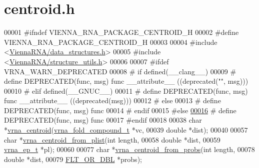 \hypertarget{centroid_8h_source}{}\section{centroid.\+h}
\label{centroid_8h_source}

\begin{DoxyCode}
00001 \textcolor{preprocessor}{#ifndef VIENNA\_RNA\_PACKAGE\_CENTROID\_H}
00002 \textcolor{preprocessor}{#define VIENNA\_RNA\_PACKAGE\_CENTROID\_H}
00003 
00004 \textcolor{preprocessor}{#include <\mbox{\hyperlink{data__structures_8h}{ViennaRNA/data\_structures.h}}>}
00005 \textcolor{preprocessor}{#include <\mbox{\hyperlink{structure__utils_8h}{ViennaRNA/structure\_utils.h}}>}
00006 
00007 \textcolor{preprocessor}{#ifdef VRNA\_WARN\_DEPRECATED}
00008 \textcolor{preprocessor}{# if defined(\_\_clang\_\_)}
00009 \textcolor{preprocessor}{#  define DEPRECATED(func, msg) func \_\_attribute\_\_ ((deprecated("", msg)))}
00010 \textcolor{preprocessor}{# elif defined(\_\_GNUC\_\_)}
00011 \textcolor{preprocessor}{#  define DEPRECATED(func, msg) func \_\_attribute\_\_ ((deprecated(msg)))}
00012 \textcolor{preprocessor}{# else}
00013 \textcolor{preprocessor}{#  define DEPRECATED(func, msg) func}
00014 \textcolor{preprocessor}{# endif}
00015 \textcolor{preprocessor}{#else}
\mbox{\hyperlink{centroid_8h_aab347a3c03fbe8e7319551b9fa0cce4a}{00016}} \textcolor{preprocessor}{# define DEPRECATED(func, msg) func}
00017 \textcolor{preprocessor}{#endif}
00018 
00038 \textcolor{keywordtype}{char} *\mbox{\hyperlink{group__centroid__fold_ga0e64bb67e51963dc71cbd4d30b80a018}{vrna\_centroid}}(\mbox{\hyperlink{group__fold__compound_structvrna__fc__s}{vrna\_fold\_compound\_t}} *vc,
00039                     \textcolor{keywordtype}{double} *dist);
00040 
00057 \textcolor{keywordtype}{char}  *\mbox{\hyperlink{group__centroid__fold_ga13881673a0b214d42a59140ef5764dbb}{vrna\_centroid\_from\_plist}}(\textcolor{keywordtype}{int} length,
00058                                 \textcolor{keywordtype}{double} *dist,
00059                                 \mbox{\hyperlink{group__struct__utils_structvrna__elem__prob__s}{vrna\_ep\_t}} *pl);
00060 
00077 \textcolor{keywordtype}{char}  *\mbox{\hyperlink{group__centroid__fold_ga98193ede06778a9ea966cc8fc43d0804}{vrna\_centroid\_from\_probs}}(\textcolor{keywordtype}{int} length,
00078                                 \textcolor{keywordtype}{double} *dist,
00079                                 \mbox{\hyperlink{group__data__structures_ga31125aeace516926bf7f251f759b6126}{FLT\_OR\_DBL}} *probs);

\end{DoxyCode}
